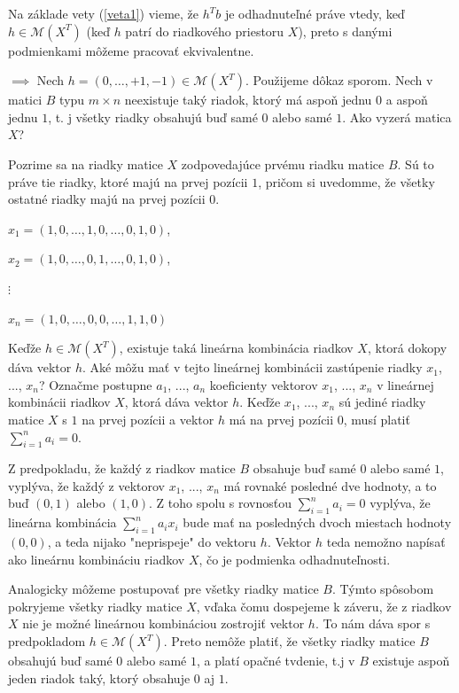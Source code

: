 \begin{dokaz}
Na základe vety (\ref{veta1}) vieme, že $h^T b$ je odhadnuteľné práve vtedy, keď $h \in \mathcal{M}(X^T)$
(keď $h$ patrí do riadkového priestoru $X$),
preto s danými podmienkami môžeme pracovať ekvivalentne.

$\boxed{\implies}$ Nech $h = (0, \ldots, +1, -1) \in \mathcal{M}(X^T)$. Použijeme dôkaz sporom. 
Nech v matici $B$ typu $m \times n$ neexistuje taký riadok, ktorý má aspoň jednu $0$ a aspoň jednu $1$,
t. j všetky riadky obsahujú buď samé $0$ alebo samé $1$.
Ako vyzerá matica $X$?

Pozrime sa na riadky matice $X$ zodpovedajúce prvému riadku matice $B$.
Sú to práve tie riadky, ktoré majú na prvej pozícii $1$, pričom si uvedomme, že všetky ostatné riadky majú na prvej pozícii $0$.

\begin{center}
$
x_1 = (1, 0, \ldots, 1, 0, \ldots, 0, 1, 0)
$,
\end{center}
\begin{center}
$
x_2 = (1, 0, \ldots, 0, 1, \ldots, 0, 1, 0)
$,
\end{center}
\begin{center}
$\vdots$
\end{center}
\begin{center}
$
x_n = (1, 0, \ldots, 0, 0, \ldots, 1, 1, 0)
$
\end{center}

Keďže $h \in \mathcal{M}(X^T)$, existuje taká lineárna kombinácia riadkov $X$, ktorá dokopy dáva vektor $h$.
Aké môžu mať v tejto lineárnej kombinácii zastúpenie riadky $x_1$, ..., $x_n$?
Označme postupne $a_1$, ..., $a_n$ koeficienty vektorov $x_1$, ..., $x_n$ v lineárnej kombinácii riadkov $X$, ktorá dáva vektor $h$.
Keďže $x_1$, ..., $x_n$ sú jediné riadky matice $X$ s $1$ na prvej pozícii a vektor $h$ má na prvej pozícii $0$,
musí platiť $\sum_{i = 1}^n a_i = 0$.

Z predpokladu, že každý z riadkov matice $B$ obsahuje buď samé $0$ alebo samé $1$, vyplýva,
že každý z vektorov $x_1$, ..., $x_n$ má rovnaké posledné dve hodnoty, a to buď $(0, 1)$ alebo $(1, 0)$.
Z toho spolu s rovnosťou $\sum_{i = 1}^n a_i = 0$ vyplýva, že lineárna kombinácia $\sum_{i = 1}^n a_i x_i$
bude mať na posledných dvoch miestach hodnoty $(0, 0)$, a teda nijako "neprispeje" do vektoru $h$.
Vektor $h$ teda nemožno napísať ako lineárnu kombináciu riadkov $X$, čo je podmienka odhadnuteľnosti.

Analogicky môžeme postupovať pre všetky riadky matice $B$.
Týmto spôsobom pokryjeme všetky riadky matice $X$, vďaka čomu dospejeme k záveru,
že z riadkov $X$ nie je možné lineárnou kombináciou zostrojiť vektor $h$.
To nám dáva spor s predpokladom $h \in \mathcal{M}(X^T)$.
Preto nemôže platiť, že všetky riadky matice $B$ obsahujú buď samé $0$ alebo samé $1$,
a platí opačné tvdenie, t.j v $B$ existuje aspoň jeden riadok taký, ktorý obsahuje $0$ aj $1$.


\end{dokaz}
